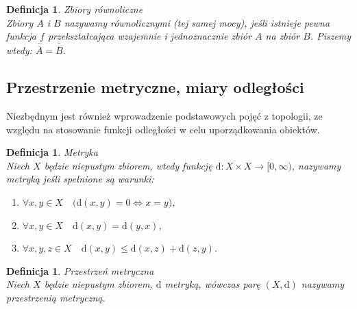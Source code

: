 \documentclass[12pt,a4paper]{report}
\newtheorem{definition}[theorem]{Definicja}
\newcommand{\licznosc}[1]{\overline{\overline{#1}}}
\begin{document}
\begin{definition}{Zbiory równoliczne \cite[Rozdział 2]{kuratowski2004}\\}
Zbiory $A$ i $B$ nazywamy równolicznymi (tej samej mocy), jeśli istnieje pewna funkcja $f$ przekształcająca wzajemnie i jednoznacznie zbiór $A$ na zbiór $B$. Piszemy wtedy: $\licznosc{A}=\licznosc{B}$.
\end{definition}





\subsection{Przestrzenie metryczne, miary odległości}
\noindent

Niezbędnym jest również wprowadzenie podstawowych pojęć z topologii, ze względu na stosowanie funkcji odległości w celu uporządkowania obiektów.\\

\begin{definition}{Metryka \cite[Rozdzial 9]{kuratowski2004}\\}
Niech $X$ będzie niepustym zbiorem, wtedy funkcję $\mathrm{d}: X \times X \rightarrow [0,\infty)$, nazywamy metryką jeśli spełnione są warunki:
\begin{enumerate}
\item $\forall x, y \in X \quad \big(\mathrm{d}(x,y) = 0  \Longleftrightarrow x=y \big)$,
\item $\forall x, y \in X \quad \mathrm{d}(x,y)=\mathrm{d}(y,x)$,
\item $\forall  x, y, z \in X \quad \mathrm{d}(x,y)\leq \mathrm{d}(x,z)+\mathrm{d}(z,y)$.\\
\end{enumerate}
\end{definition}

\begin{definition}{Przestrzeń metryczna \cite[Rozdział 9]{kuratowski2004}\\}
Niech $X$ będzie niepustym zbiorem, $\mathrm{d}$ metryką, wówczas parę $(X,\mathrm{d})$ nazywamy przestrzenią metryczną. \\
\end{definition}
\end{document}
